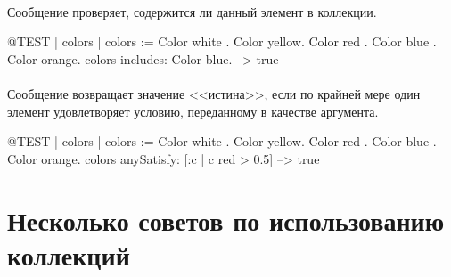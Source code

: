 \documentclass[a4paper,10pt,twoside]{book}
\begin{document}
\paragraph{} Сообщение  проверяет, содержится ли данный элемент в коллекции.

\begin{code}{@TEST | colors |}
colors := {Color white . Color yellow. Color red . Color blue . Color orange}.
colors includes: Color blue. --> true
\end{code}

\paragraph{} Сообщение  возвращает значение <<истина>>, если по крайней мере один элемент удовлетворяет условию, переданному в качестве аргумента.

\begin{code}{@TEST | colors | colors := {Color white . Color yellow. Color red . Color blue . Color orange}.}
colors anySatisfy: [:c | c red > 0.5] --> true
\end{code}
\section{Несколько советов по использованию коллекций}

\end{document}
